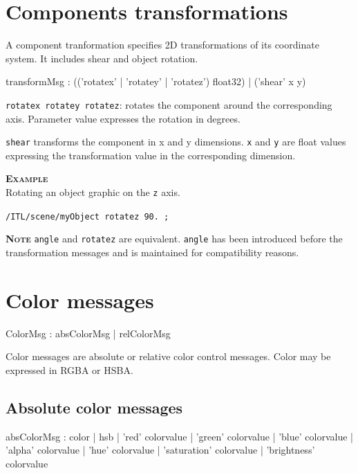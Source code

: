 \documentclass[a4paper,twoside]{report}
\newcommand{\sublevel}[1]	{\section{#1}}
\newcommand{\subsublevel}[1]	{\subsection{#1}}
\newcommand{\OSC}[1]		{\texttt{#1}}
\newcommand{\example}		{\textbf{\hspace{-1.5cm}\textbf{\textsc{Example }}}}
\newcommand{\note}	[1]		{\vspace{2mm}\textbf{\hspace{-0.9cm}\textbf{\textsc{Note #1}}}}
\let\olditemize\itemize
\let\oldenditemize\enditemize
\renewenvironment{itemize} 	{\olditemize \setlength{\itemsep}{1mm}}{\oldenditemize}
\newcommand{\sample}	[1]			{\vspace{-2mm}\begin{center}\colorbox{mygrey}{
								\begin{minipage}[t]{0.9\columnwidth} 
								{\small \texttt{#1}}
								\end{minipage}}\end{center}}
\begin{document}
\sublevel{Components transformations}
\label{transform}

A component tranformation specifies 2D transformations of its coordinate system. It includes shear and object rotation.

\begin{rail}
transformMsg :
			(('rotatex' | 'rotatey' | 'rotatez') float32)
		| 	('shear' x y)
\end{rail}

\begin{itemize}
\item \OSC{rotatex rotatey rotatez}: rotates the component around the corresponding axis. Parameter value expresses the rotation in degrees.
\item \OSC{shear} transforms the component in x and y dimensions. \OSC{x} and \OSC{y} are float values expressing the transformation value in the corresponding dimension.
\end{itemize}

\example \\
Rotating an object graphic on the \OSC{z} axis.
\sample{/ITL/scene/myObject rotatez 90. ;}

\note{} \OSC{angle} and \OSC{rotatez} are equivalent. \OSC{angle} has been introduced before the transformation messages and is maintained for compatibility reasons.

\sublevel{Color messages}
\label{colormsg}


\begin{rail}
ColorMsg : 	absColorMsg 
			|	relColorMsg 
\end{rail}

Color messages are absolute or relative color control messages. Color may be expressed in RGBA or HSBA.

\subsublevel{Absolute color messages}

\begin{rail}
absColorMsg :    color
			| hsb
			| 'red' colorvalue
			| 'green' colorvalue
			| 'blue' colorvalue
			| 'alpha' colorvalue
			| 'hue' colorvalue
			| 'saturation' colorvalue
			| 'brightness' colorvalue
\end{rail}
\end{document}
